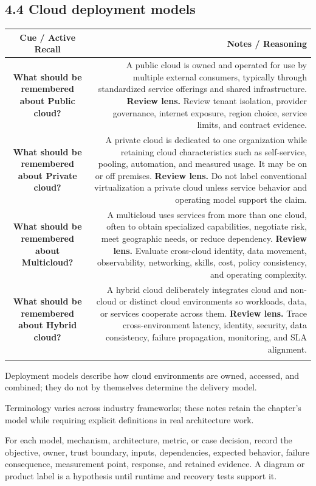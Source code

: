 \documentclass[11pt]{article}
\newcommand{\CornellHeader}{\rowcolor{Navy}\color{white}\bfseries Cue / Active Recall & \color{white}\bfseries Notes / Reasoning \\\endhead}
\newcommand{\CornellRow}[2]{\cellcolor{CueGray}\textbf{#1} & #2 \\\addlinespace[3pt]}
\begin{document}
\subsection{4.4 Cloud deployment models}
\begin{longtable}{@{}C N@{}}
\CornellHeader
\CornellRow{What should be remembered about Public cloud?}{A public cloud is owned and operated for use by multiple external consumers, typically through standardized service offerings and shared infrastructure. \textbf{Review lens.} Review tenant isolation, provider governance, internet exposure, region choice, service limits, and contract evidence.}
\CornellRow{What should be remembered about Private cloud?}{A private cloud is dedicated to one organization while retaining cloud characteristics such as self-service, pooling, automation, and measured usage. It may be on or off premises. \textbf{Review lens.} Do not label conventional virtualization a private cloud unless service behavior and operating model support the claim.}
\CornellRow{What should be remembered about Multicloud?}{A multicloud uses services from more than one cloud, often to obtain specialized capabilities, negotiate risk, meet geographic needs, or reduce dependency. \textbf{Review lens.} Evaluate cross-cloud identity, data movement, observability, networking, skills, cost, policy consistency, and operating complexity.}
\CornellRow{What should be remembered about Hybrid cloud?}{A hybrid cloud deliberately integrates cloud and non-cloud or distinct cloud environments so workloads, data, or services cooperate across them. \textbf{Review lens.} Trace cross-environment latency, identity, security, data consistency, failure propagation, monitoring, and SLA alignment.}
\end{longtable}
\begin{sectionsummarybox}
Deployment models describe how cloud environments are owned, accessed, and combined; they do not by themselves determine the delivery model.
\end{sectionsummarybox}
\begin{scopenotebox}
Terminology varies across industry frameworks; these notes retain the chapter's model while requiring explicit definitions in real architecture work.
\end{scopenotebox}
\begin{practicebox}
For each model, mechanism, architecture, metric, or case decision, record the objective, owner, trust boundary, inputs, dependencies, expected behavior, failure consequence, measurement point, response, and retained evidence. A diagram or product label is a hypothesis until runtime and recovery tests support it.
\end{practicebox}
\end{document}
